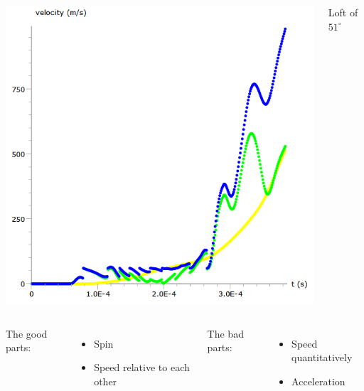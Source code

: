 \documentclass{beamer}
\begin{document}
\begin{frame}
\begin{columns}
\includegraphics[width = 1.0\textwidth]{loft51}
\begin{center}\scriptsize Loft of $51^{\circ}$   \end{center}
\end{columns}

\pause

\begin{columns}
\begin{center}The good parts:\end{center} \vspace{-2.5ex}
\begin{itemize}
\item Spin
\item Speed relative to each other
\end{itemize}
\pause

\begin{center}The bad parts:\end{center} \vspace{-2.5ex}
\begin{itemize}
\item Speed quantitatively
\item Acceleration
\end{itemize}
\end{columns}

\end{frame}
\end{document}
